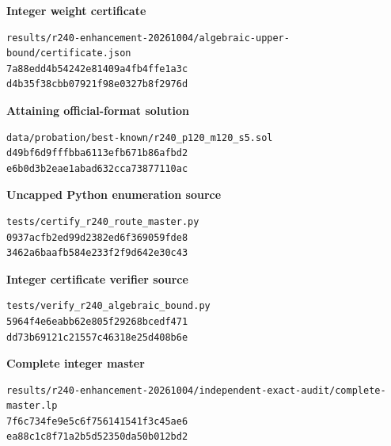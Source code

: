 \documentclass[11pt,a4paper]{article}
\begin{document}
\noindent\textbf{Integer weight certificate}\par
\begin{verbatim}
results/r240-enhancement-20261004/algebraic-upper-bound/certificate.json
7a88edd4b54242e81409a4fb4ffe1a3c
d4b35f38cbb07921f98e0327b8f2976d
\end{verbatim}

\noindent\textbf{Attaining official-format solution}\par
\begin{verbatim}
data/probation/best-known/r240_p120_m120_s5.sol
d49bf6d9fffbba6113efb671b86afbd2
e6b0d3b2eae1abad632cca73877110ac
\end{verbatim}

\noindent\textbf{Uncapped Python enumeration source}\par
\begin{verbatim}
tests/certify_r240_route_master.py
0937acfb2ed99d2382ed6f369059fde8
3462a6baafb584e233f2f9d642e30c43
\end{verbatim}

\noindent\textbf{Integer certificate verifier source}\par
\begin{verbatim}
tests/verify_r240_algebraic_bound.py
5964f4e6eabb62e805f29268bcedf471
dd73b69121c21557c46318e25d408b6e
\end{verbatim}

\noindent\textbf{Complete integer master}\par
\begin{verbatim}
results/r240-enhancement-20261004/independent-exact-audit/complete-master.lp
7f6c734fe9e5c6f756141541f3c45ae6
ea88c1c8f71a2b5d52350da50b012bd2
\end{verbatim}
\end{document}
